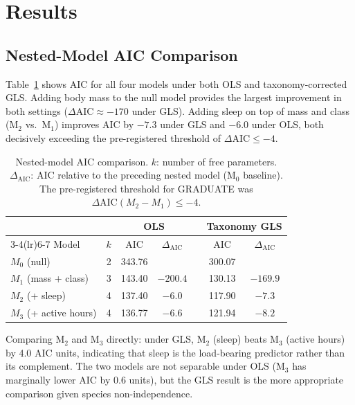 \documentclass{article}
\begin{document}

\section{Results}
\label{sec:results}

\subsection{Nested-Model AIC Comparison}

Table~\ref{tab:aic} shows AIC for all four models under both OLS and taxonomy-corrected
GLS. Adding body mass to the null model provides the largest improvement in both settings
($\Delta\text{AIC} \approx -170$ under GLS). Adding sleep on top of mass and class
(M$_2$ vs.\ M$_1$) improves AIC by $-7.3$ under GLS and $-6.0$ under OLS, both
decisively exceeding the pre-registered threshold of $\Delta\text{AIC} \leq -4$.

\begin{table}[t]
  \caption{Nested-model AIC comparison. $k$: number of free parameters.
  $\Delta_{\text{AIC}}$: AIC relative to the preceding nested model (M$_0$ baseline).
  The pre-registered threshold for GRADUATE was $\Delta\text{AIC}(M_2 - M_1) \leq -4$.}
  \label{tab:aic}
  \centering
  \small
  \begin{tabular}{lrccrcc}
    \toprule
    & & \multicolumn{2}{c}{OLS} & \phantom{ab} & \multicolumn{2}{c}{Taxonomy GLS} \\
    \cmidrule(lr){3-4}\cmidrule(lr){6-7}
    Model & $k$ & AIC & $\Delta_{\text{AIC}}$ && AIC & $\Delta_{\text{AIC}}$ \\
    \midrule
    $M_0$ (null)               & 2 & 343.76 &         && 300.07 &         \\
    $M_1$ (mass + class)       & 3 & 143.40 & $-200.4$ && 130.13 & $-169.9$ \\
    $M_2$ (+ sleep)            & 4 & 137.40 & $-6.0$  && 117.90 & $-7.3$ \\
    $M_3$ (+ active hours)     & 4 & 136.77 & $-6.6$  && 121.94 & $-8.2$ \\
    \bottomrule
  \end{tabular}
\end{table}

Comparing M$_2$ and M$_3$ directly: under GLS, M$_2$ (sleep) beats M$_3$ (active hours)
by 4.0 AIC units, indicating that sleep is the load-bearing predictor rather than its
complement. The two models are not separable under OLS (M$_3$ has marginally lower AIC
by 0.6 units), but the GLS result is the more appropriate comparison given species
non-independence.
\end{document}
